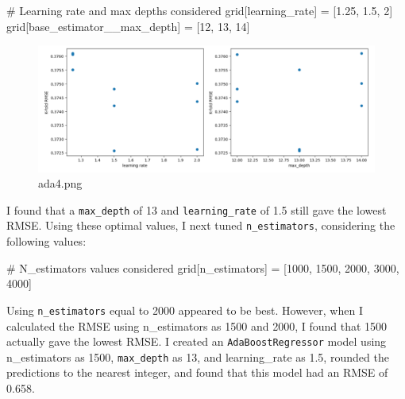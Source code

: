 \documentclass[
  letterpaper,
  DIV=11,
  numbers=noendperiod]{scrartcl}
\newenvironment{Shaded}{\begin{snugshade}}{\end{snugshade}}
\newcommand{\CommentTok}[1]{\textcolor[rgb]{0.37,0.37,0.37}{#1}}
\newcommand{\DecValTok}[1]{\textcolor[rgb]{0.68,0.00,0.00}{#1}}
\newcommand{\FloatTok}[1]{\textcolor[rgb]{0.68,0.00,0.00}{#1}}
\newcommand{\NormalTok}[1]{\textcolor[rgb]{0.00,0.23,0.31}{#1}}
\newcommand{\OperatorTok}[1]{\textcolor[rgb]{0.37,0.37,0.37}{#1}}
\newcommand{\StringTok}[1]{\textcolor[rgb]{0.13,0.47,0.30}{#1}}
\begin{document}
\begin{Shaded}
\begin{Highlighting}[]
\CommentTok{\# Learning rate and max depths considered}
\NormalTok{grid[}\StringTok{\textquotesingle{}learning\_rate\textquotesingle{}}\NormalTok{] }\OperatorTok{=}\NormalTok{ [}\FloatTok{1.25}\NormalTok{, }\FloatTok{1.5}\NormalTok{, }\DecValTok{2}\NormalTok{]}
\NormalTok{grid[}\StringTok{\textquotesingle{}base\_estimator\_\_max\_depth\textquotesingle{}}\NormalTok{] }\OperatorTok{=}\NormalTok{ [}\DecValTok{12}\NormalTok{, }\DecValTok{13}\NormalTok{, }\DecValTok{14}\NormalTok{]}
\end{Highlighting}
\end{Shaded}

\begin{figure}

{\centering \includegraphics{Project_Report_Saturn_files/figure-pdf/ada4.png}

}

\caption{ada4.png}

\end{figure}

I found that a \texttt{max\_depth} of 13 and \texttt{learning\_rate} of
1.5 still gave the lowest RMSE. Using these optimal values, I next tuned
\texttt{n\_estimators}, considering the following values:

\begin{Shaded}
\begin{Highlighting}[]
\CommentTok{\# N\_estimators values considered}
\NormalTok{grid[}\StringTok{\textquotesingle{}n\_estimators\textquotesingle{}}\NormalTok{] }\OperatorTok{=}\NormalTok{ [}\DecValTok{1000}\NormalTok{, }\DecValTok{1500}\NormalTok{, }\DecValTok{2000}\NormalTok{, }\DecValTok{3000}\NormalTok{, }\DecValTok{4000}\NormalTok{]}
\end{Highlighting}
\end{Shaded}

Using \texttt{n\_estimators} equal to 2000 appeared to be best. However,
when I calculated the RMSE using n\_estimators as 1500 and 2000, I found
that 1500 actually gave the lowest RMSE. I created an
\texttt{AdaBoostRegressor} model using n\_estimators as 1500,
\texttt{max\_depth} as 13, and learning\_rate as 1.5, rounded the
predictions to the nearest integer, and found that this model had an
RMSE of 0.658.
\end{document}
